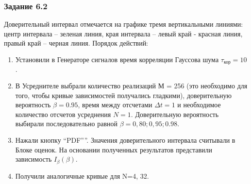 \subsubsection[Задание 6.1]{Задание 6.2}
Доверительный интервал отмечается на графике тремя вертикальными линиями: центр интервала – зеленая линия, края интервала – левый край - красная линия, правый край – черная линия.
Порядок действий:
\begin{enumerate}
	\item Установили в Генераторе сигналов время корреляции Гауссова шума $\tau_\text{кор}=10$.
	\item В Усреднителе выбрали количество реализаций М = 256 (это необходимо для того, чтобы кривые зависимостей получались гладкими), доверительную вероятность $\beta = 0.95$, время между отсчетами $\Delta t = 1$ и необходимое количество отсчетов усреднения $N=1$. Доверительную вероятность выбирали последовательно равной $\beta = 0,80; 0,95; 0.98$.
	\item Нажали кнопку “PDF””. Значения доверительного интервала считывали в Блоке оценок. На основании полученных результатов представили зависимость $I_{\beta}(\beta)$.
	\item Получили аналогичные кривые для N=4, 32.
\end{enumerate}

